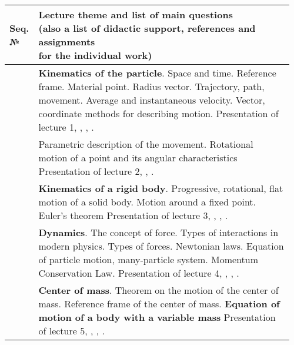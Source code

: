 \documentclass{rnp}
\begin{document}
\begin{longtable}{|>{\arraybackslash}m{0.06\linewidth}|>{\raggedright\arraybackslash}m{0.9\linewidth}|}
\hline 
 \rowcolor{gray!20} \thead{Seq. \\ №} & \thead {Lecture theme and list of main questions \\ (also a list of didactic support, references and assignments \\ for the individual work) } \\ 
\hline
\endhead 
	\thead{\rownumber.} 
	& \textbf{Kinematics of the particle}. Space and time. Reference frame. Material point. Radius vector. Trajectory, path, movement. Average and instantaneous velocity. Vector, coordinate methods for describing motion.\newline 
	Presentation of lecture 1, \cite[\S~1.1]{IrodovMechanics}, \cite[Chapter 2]{BerkeleyMechanics}, \cite[Chapter 2, Chapter 3, Chapter 4]{Holyday}.
	\\ 
	\hline 
	\thead{\rownumber.} 
	& Parametric description of the movement. Rotational motion of a point and its angular characteristics\newline 
	Presentation of lecture 2, \cite[\S~1.1, 1.2]{IrodovMechanics}, \cite[Chapter 2]{BerkeleyMechanics}.
	\\ 
	\hline 
	\thead{\rownumber.} 
	& \textbf{Kinematics of a rigid body}. Progressive, rotational, flat motion of a solid body. Motion around a fixed point. Euler's theorem \newline
	Presentation of lecture 3, \cite[\S~1.2]{IrodovMechanics}, \cite[Chapter 2]{BerkeleyMechanics}, \cite[Sections 10-1, 10-2, 10-3, 11-1]{Holyday}.
	\\ 
	\hline 
	\thead{\rownumber.} 
	& \textbf{Dynamics}. The concept of force. Types of interactions in modern physics. Types of forces. Newtonian laws. Equation of particle motion, many-particle system. Momentum Conservation Law. \newline
	Presentation of lecture 4, \cite[Chapter 2 (except  \S~2.5)]{IrodovMechanics}, \cite[Chapter 3]{BerkeleyMechanics}, \cite[Sections 1-3, Chapter 5, Chapter 6]{Holyday}.
	\\  
	\hline 
	\thead{\rownumber.} 
	& \textbf{Center of mass}. Theorem on the motion of the center of mass. Reference frame of the center of mass. \textbf{Equation of motion of a body with a variable mass} 
	\newline
	Presentation of lecture 5, \cite[Chapter 4]{IrodovMechanics}, \cite[Conservation of momentum]{BerkeleyMechanics}, \cite[Chapter 9]{Holyday}.

\end{longtable}
\end{document}
